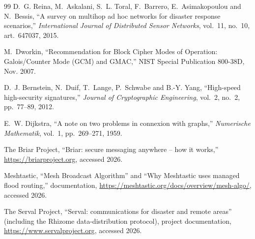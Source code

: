 \begin{thebibliography}{99}
D.~G. Reina, M.~Askalani, S.~L. Toral, F.~Barrero, E.~Asimakopoulou and N.~Bessis, ``A survey on multihop ad hoc networks for disaster response scenarios,'' \emph{International Journal of Distributed Sensor Networks}, vol.~11, no.~10, art.~647037, 2015.

M.~Dworkin, ``Recommendation for Block Cipher Modes of Operation: Galois/Counter Mode (GCM) and GMAC,'' NIST Special Publication 800-38D, Nov. 2007.

D.~J. Bernstein, N.~Duif, T.~Lange, P.~Schwabe and B.-Y. Yang, ``High-speed high-security signatures,'' \emph{Journal of Cryptographic Engineering}, vol.~2, no.~2, pp.~77--89, 2012.

E.~W. Dijkstra, ``A note on two problems in connexion with graphs,'' \emph{Numerische Mathematik}, vol.~1, pp.~269--271, 1959.

The Briar Project, ``Briar: secure messaging anywhere -- how it works,'' \url{https://briarproject.org}, accessed 2026.

Meshtastic, ``Mesh Broadcast Algorithm'' and ``Why Meshtastic uses managed flood routing,'' documentation, \url{https://meshtastic.org/docs/overview/mesh-algo/}, accessed 2026.

The Serval Project, ``Serval: communications for disaster and remote areas'' (including the Rhizome data-distribution protocol), project documentation, \url{https://www.servalproject.org}, accessed 2026.
\end{thebibliography}
